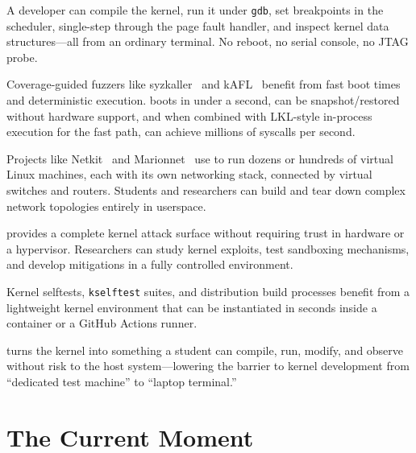 \begin{description}[style=nextline,leftmargin=2em]
  \item[Kernel development and debugging.]
    A developer can compile the kernel, run it under \texttt{gdb}, set
    breakpoints in the scheduler, single-step through the page fault handler,
    and inspect kernel data structures---all from an ordinary terminal.
    No reboot, no serial console, no JTAG probe.

  \item[Kernel fuzzing.]
    Coverage-guided fuzzers like syzkaller~\cite{syzkaller} and
    kAFL~\cite{schumilo2017} benefit from fast boot times and deterministic
    execution.  \UML{} boots in under a second, can be snapshot/restored
    without hardware support, and when combined with \textsc{LKL}-style
    in-process execution for the fast path, can achieve millions of syscalls
    per second.

  \item[Network simulation.]
    Projects like Netkit~\cite{pizzonia2008} and Marionnet~\cite{marionnet}
    use \UML{} to run dozens or hundreds of virtual Linux machines, each with
    its own networking stack, connected by virtual switches and routers.
    Students and researchers can build and tear down complex network topologies
    entirely in userspace.

  \item[Security research.]
    \UML{} provides a complete kernel attack surface without requiring trust in
    hardware or a hypervisor.  Researchers can study kernel exploits, test
    sandboxing mechanisms, and develop mitigations in a fully controlled
    environment.

  \item[CI/CD and automated testing.]
    Kernel selftests, \texttt{kselftest} suites, and distribution build
    processes benefit from a lightweight kernel environment that can be
    instantiated in seconds inside a container or a GitHub Actions runner.

  \item[Education.]
    \UML{} turns the kernel into something a student can compile, run, modify,
    and observe without risk to the host system---lowering the barrier to
    kernel development from ``dedicated test machine'' to ``laptop terminal.''
\end{description}


\section{The Current Moment}
\label{sec:intro-moment}

